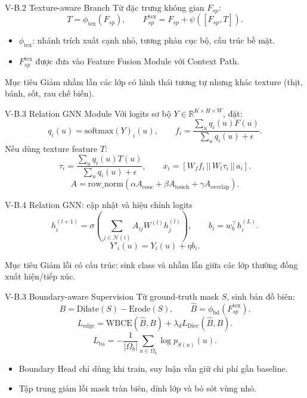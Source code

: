 \begin{frame}{V-B.2 Texture-aware Branch}
  \small
  Từ đặc trưng không gian $F_{sp}$:
  \[
    T = \phi_{\text{tex}}(F_{sp}), \qquad
    F_{sp}^{\text{tex}} = F_{sp} + \psi([F_{sp}, T]).
  \]
  \begin{itemize}
    \item $\phi_{\text{tex}}$: nhánh trích xuất cạnh nhỏ, tương phản cục bộ, cấu trúc bề mặt.
    \item $F_{sp}^{\text{tex}}$ được đưa vào Feature Fusion Module với Context Path.
  \end{itemize}
  \begin{block}{Mục tiêu}
    Giảm nhầm lẫn các lớp có hình thái tương tự nhưng khác texture (thịt, bánh, sốt, rau chế biến).
  \end{block}
\end{frame}

\begin{frame}{V-B.3 Relation GNN Module}
  \small
  Với logits sơ bộ $Y \in \mathbb{R}^{K \times H \times W}$, đặt:
  \[
    q_i(u) = \mathrm{softmax}(Y)_i(u), \qquad
    f_i = \frac{\sum_u q_i(u)F(u)}{\sum_u q_i(u)+\epsilon}.
  \]
  Nếu dùng texture feature $T$:
  \[
    \tau_i = \frac{\sum_u q_i(u)T(u)}{\sum_u q_i(u)+\epsilon}, \qquad
    x_i = [W_f f_i \, || \, W_t \tau_i \, || \, a_i].
  \]
  \[
    A = \mathrm{row\_norm}(\alpha A_{\text{cooc}} + \beta A_{\text{touch}} + \gamma A_{\text{overlap}}).
  \]
\end{frame}

\begin{frame}{V-B.4 Relation GNN: cập nhật và hiệu chỉnh logits}
  \small
  \[
    h_i^{(l+1)} = \sigma\!\left(\sum_{j \in \mathcal{N}(i)} A_{ij} W^{(l)} h_j^{(l)}\right),
    \qquad
    b_i = w_b^\top h_i^{(L)}.
  \]
  \[
    Y'_i(u) = Y_i(u) + \eta b_i.
  \]
  \begin{block}{Mục tiêu}
    Giảm lỗi có cấu trúc: sink class và nhầm lẫn giữa các lớp thường đồng xuất hiện/tiếp xúc.
  \end{block}
\end{frame}

\begin{frame}{V-B.3 Boundary-aware Supervision}
  \small
  Từ ground-truth mask $S$, sinh bản đồ biên:
  \[
    B = \mathrm{Dilate}(S) - \mathrm{Erode}(S), \qquad
    \hat{B} = \phi_{\text{bd}}(F_{sp}^{\text{tex}}).
  \]
  \[
    L_{\text{edge}} = \mathrm{WBCE}(\hat{B}, B) + \lambda_d L_{\text{Dice}}(\hat{B}, B).
  \]
  \[
    L_{\text{ba}} = -\frac{1}{|\Omega_b|}\sum_{u \in \Omega_b}\log p_{S(u)}(u).
  \]
  \begin{itemize}
    \item Boundary Head chỉ dùng khi train, suy luận vẫn giữ chi phí gần baseline.
    \item Tập trung giảm lỗi mask tràn biên, dính lớp và bỏ sót vùng nhỏ.
  \end{itemize}
\end{frame}

